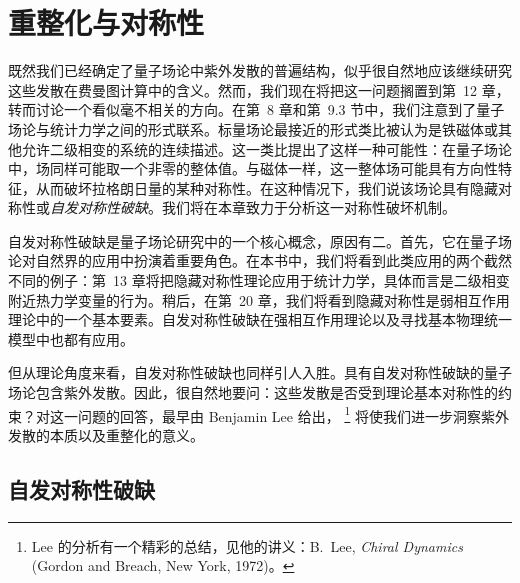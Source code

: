 \chapter{重整化与对称性}

既然我们已经确定了量子场论中紫外发散的普遍结构，似乎很自然地应该继续研究这些发散在费曼图计算中的含义。然而，我们现在将把这一问题搁置到第~12 章，转而讨论一个看似毫不相关的方向。在第~8 章和第~9.3 节中，我们注意到了量子场论与统计力学之间的形式联系。标量场论最接近的形式类比被认为是铁磁体或其他允许二级相变的系统的连续描述。这一类比提出了这样一种可能性：在量子场论中，场同样可能取一个非零的整体值。与磁体一样，这一整体场可能具有方向性特征，从而破坏拉格朗日量的某种对称性。在这种情况下，我们说该场论具有隐藏对称性或\emph{自发对称性破缺}。我们将在本章致力于分析这一对称性破坏机制。

自发对称性破缺是量子场论研究中的一个核心概念，原因有二。首先，它在量子场论对自然界的应用中扮演着重要角色。在本书中，我们将看到此类应用的两个截然不同的例子：第~13 章将把隐藏对称性理论应用于统计力学，具体而言是二级相变附近热力学变量的行为。稍后，在第~20 章，我们将看到隐藏对称性是弱相互作用理论中的一个基本要素。自发对称性破缺在强相互作用理论以及寻找基本物理统一模型中也都有应用。

但从理论角度来看，自发对称性破缺也同样引人入胜。具有自发对称性破缺的量子场论包含紫外发散。因此，很自然地要问：这些发散是否受到理论基本对称性的约束？对这一问题的回答，最早由 Benjamin Lee 给出，%
\footnote{Lee 的分析有一个精彩的总结，见他的讲义：B.~Lee, \emph{Chiral Dynamics} (Gordon and Breach, New York, 1972)。}
将使我们进一步洞察紫外发散的本质以及重整化的意义。

\section{自发对称性破缺}

